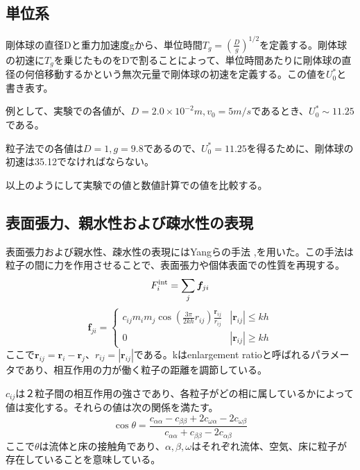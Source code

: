 \documentclass[]{jsarticle}
\begin{document}
\subsection{単位系}
剛体球の直径Dと重力加速度gから、単位時間$T_g=(\frac{D}{g})^{1/2}$を定義する。剛体球の初速に$T_g$を乗じたものをDで割ることによって、単位時間あたりに剛体球の直径の何倍移動するかという無次元量で剛体球の初速を定義する。この値を$U_0^*$と書き表す。

例として、実験での各値が、$D=2.0\times10^{-2}m,v_0=5m/s$であるとき、$U_0^*\sim11.25$である。

粒子法での各値は$D=1, g=9.8$であるので、$U_0^*=11.25$を得るために、剛体球の初速は35.12でなければならない。

以上のようにして実験での値と数値計算での値を比較する。




\subsection{表面張力、親水性および疎水性の表現}
表面張力および親水性、疎水性の表現にはYangらの手法 \cite{Yang2016},\cite{Yang2017}を用いた。この手法は粒子の間に力を作用させることで、表面張力や個体表面での性質を再現する。
\begin{equation}
F^{\rm{int}}_i=\sum_{j} \bm{f}_{ji}
\end{equation}
\begin{equation}
  \bm{f}_{ji}=\begin{cases}
    c_{ij}m_im_j\cos(\frac{3\pi}{2kh}r_{ij})\frac{\bm{r}_{ij}}{r_{ij}} & \text{$|\bm{r}_{ij}|\leq kh$}\\
    0 & \text{$|\bm{r}_{ij}|\geq kh$}
\end{cases}
\end{equation}
ここで$\bm{r}_{ij}=\bm{r}_i-\bm{r}_{j}$、$r_{ij}=|\bm{r}_{ij}|$である。kはenlargement ratioと呼ばれるパラメータであり、相互作用の力が働く粒子の距離を調節している。

$c_{ij}$は２粒子間の相互作用の強さであり、各粒子がどの相に属しているかによって値は変化する。それらの値は次の関係を満たす。
\begin{equation}
\cos\theta=\frac{c_{\alpha\alpha}-c_{\beta\beta}+2c_{\omega\alpha}-2c_{\omega\beta}}{c_{\alpha\alpha} +c_{\beta\beta} -2c_{\alpha\beta}}
\end{equation}
ここで$\theta$は流体と床の接触角であり、$\alpha,\beta,\omega$はそれぞれ流体、空気、床に粒子が存在していることを意味している。
\end{document}
